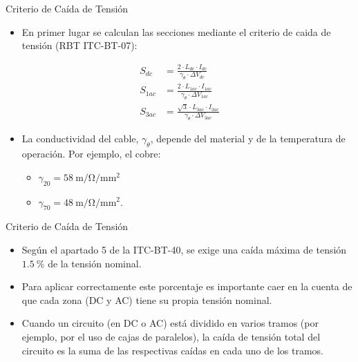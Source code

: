 \documentclass[aspectratio=169, usenames,svgnames,dvipsnames]{beamer}
\begin{document}
\begin{frame}[label={sec:org48ee6c4}]{Criterio de Caída de Tensión}
\begin{itemize}
\item En primer lugar se calculan las secciones mediante el criterio de caida de tensión (RBT ITC-BT-07):
\end{itemize}

\begin{align*}
    S_{dc} &=  \frac{2 \cdot L_{dc}\cdot I_{dc}}{\gamma_\theta \cdot \Delta V_{dc}}\\
    S_{1ac} &=  \frac{2\cdot L_{1ac}\cdot I_{1ac}}{\gamma_\theta \cdot \Delta V_{1ac}}\\
    S_{3ac} &= \frac{\sqrt{3} \cdot L_{3ac}\cdot I_{3ac}}{\gamma_\theta \cdot \Delta V_{3ac}}
  \end{align*}

\begin{itemize}
\item La conductividad del cable, \(\gamma_\theta\), depende del material y de la
temperatura de operación. Por ejemplo, el cobre:
\begin{itemize}
\item \(\gamma_{20} = \qty{58}{\meter\per\ohm\per\milli\meter\squared}\)
\item \(\gamma_{70} = \qty{48}{\meter\per\ohm\per\milli\meter\squared}\).
\end{itemize}
\end{itemize}
\end{frame}

\begin{frame}[label={sec:org595f6a4}]{Criterio de Caída de Tensión}
\begin{itemize}
\item Según el apartado 5 de la ITC-BT-40, se exige una caída máxima de
tensión \(\qty{1.5}{\percent}\) de la tensión nominal.

\item Para aplicar correctamente este porcentaje es importante caer en la
cuenta de que \alert{cada zona (DC y AC) tiene su propia tensión nominal}.

\item Cuando un circuito (en DC o AC) está dividido en varios tramos (por
ejemplo, por el uso de cajas de paralelos), la caída de tensión
total del circuito es la suma de las respectivas caídas en cada uno
de los tramos.
\end{itemize}
\end{frame}
\end{document}
